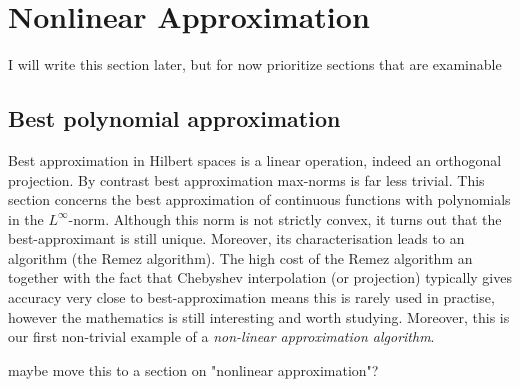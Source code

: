 
\section{Nonlinear Approximation}
%
\label{sec:nonlin}
%
\alert{I will write this section later, but for now prioritize sections 
that are examinable}

\subsection{Best polynomial approximation}
%
\label{sec:poly:bestapprox}
%
Best approximation in Hilbert spaces is a linear operation, indeed an orthogonal
projection. By contrast best approximation max-norms is far less trivial. This
section concerns the best approximation of continuous functions with polynomials
in the $L^\infty$-norm. Although this norm is not strictly convex, it turns out
that the best-approximant is still unique. Moreover, its characterisation leads
to an algorithm (the Remez algorithm). The high cost of the Remez algorithm an
together with the fact that Chebyshev interpolation (or projection) typically
gives accuracy very close to best-approximation means this is rarely used in
practise, however the mathematics is still interesting and worth studying.
Moreover, this is our first non-trivial example of a {\em non-linear
approximation algorithm}.

\alert{maybe move this to a section on "nonlinear approximation"?}


